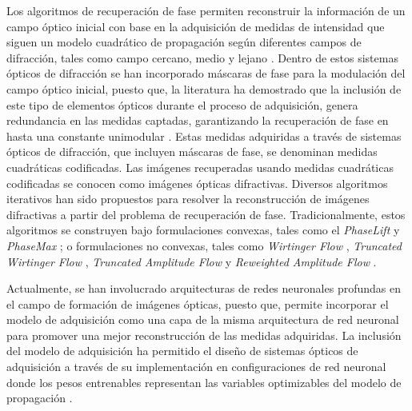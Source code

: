 Los algoritmos de recuperación de fase permiten reconstruir la información de un campo óptico inicial con base en la adquisición de medidas de intensidad que siguen un modelo cuadrático de propagación según diferentes campos de difracción, tales como campo cercano, medio y lejano . Dentro de estos sistemas ópticos de difracción se han incorporado máscaras de fase para la modulación del campo óptico inicial, puesto que, la literatura ha demostrado que la inclusión de este tipo de elementos ópticos durante el proceso de adquisición, genera redundancia en las medidas captadas, garantizando la recuperación de fase en hasta una constante unimodular . Estas medidas adquiridas a través de sistemas ópticos de difracción, que incluyen máscaras de fase, se denominan medidas cuadráticas codificadas. Las imágenes recuperadas usando medidas cuadráticas codificadas se conocen como imágenes ópticas difractivas. Diversos algoritmos iterativos han sido propuestos para resolver la reconstrucción de imágenes difractivas a partir del problema de recuperación de fase. Tradicionalmente, estos algoritmos se construyen bajo formulaciones convexas, tales como el \textit{PhaseLift}  y \textit{PhaseMax} ; o formulaciones no convexas, tales como \textit{Wirtinger Flow} , \textit{Truncated Wirtinger Flow} , \textit{Truncated Amplitude Flow}  y \textit{Reweighted Amplitude Flow} .  

Actualmente, se han involucrado arquitecturas de redes neuronales profundas en el campo de formación de imágenes ópticas, puesto que, permite incorporar el modelo de adquisición como una capa de la misma arquitectura de red neuronal para promover una mejor reconstrucción de las medidas adquiridas. La inclusión del modelo de adquisición ha permitido el diseño de sistemas ópticos de adquisición a través de su implementación en configuraciones de red neuronal donde los pesos entrenables representan las variables optimizables del modelo de propagación . 

